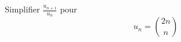 Simplifier $\frac{u_{n+1}}{u_n}$ pour
\begin{displaymath}
 u_n=\binom{2n}{n}
\end{displaymath}
\bigskip  \bigskip \bigskip